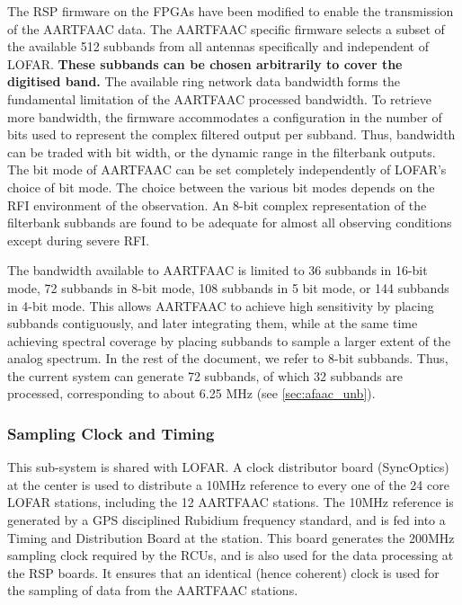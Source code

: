 \documentclass{ws-jai}
\begin{document}
The RSP firmware on  the FPGAs have been modified to  enable the transmission of
the  AARTFAAC data.   The AARTFAAC  specific firmware  selects a  subset of  the
available 512 subbands from all  antennas specifically and independent of LOFAR. \textbf {These subbands can be chosen arbitrarily to cover the digitised band.} 
The available  ring network data  bandwidth forms the fundamental  limitation of
the  AARTFAAC processed  bandwidth.  To  retrieve more  bandwidth, the  firmware
accommodates a configuration in the number of bits used to represent the complex
filtered output per  subband.  Thus, bandwidth can be traded  with bit width, or
the dynamic range  in the filterbank outputs.   The bit mode of  AARTFAAC can be
set completely independently of LOFAR's choice  of bit mode.  The choice between
the various  bit modes depends  on the RFI  environment of the  observation.  An
8-bit complex representation of the filterbank subbands are found to be adequate
for almost all observing conditions except during severe RFI.

The bandwidth available to AARTFAAC is limited to 36 subbands in 16-bit mode, 72
subbands in  8-bit mode, 108 subbands  in 5 bit  mode, or 144 subbands  in 4-bit
mode.   This allows  AARTFAAC to  achieve high  sensitivity by  placing subbands
contiguously,  and later  integrating them,  while  at the  same time  achieving
spectral coverage  by placing subbands to  sample a larger extent  of the analog
spectrum. In the  rest of the document,  we refer to 8-bit  subbands.  Thus, the
current system  can generate 72  subbands, of  which 32 subbands  are processed,
corresponding to about 6.25 MHz (see \ref{sec:afaac_unb}).\\

\subsubsection  {Sampling Clock and  Timing}
 This sub-system is  shared with
LOFAR.  A  clock  distributor  board  (SyncOptics) at  the  center  is  used  to
distribute  a 10MHz  reference  to every  one  of the  24  core LOFAR  stations,
including the 12  AARTFAAC stations.  The 10MHz reference is  generated by a GPS
disciplined  Rubidium  frequency  standard,  and   is  fed  into  a  Timing  and
Distribution Board  at the  station.  This board  generates the  200MHz sampling
clock required by the RCUs, and is also  used for the data processing at the RSP
boards. It  ensures that  an identical  (hence coherent) clock  is used  for the
sampling of data from the AARTFAAC stations.
\end{document}
